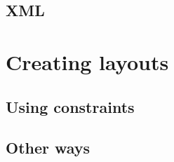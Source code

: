    \subsection{\mxp XML}

  \section{Creating layouts}

   \subsection{Using constraints}

   \subsection{Other ways}

